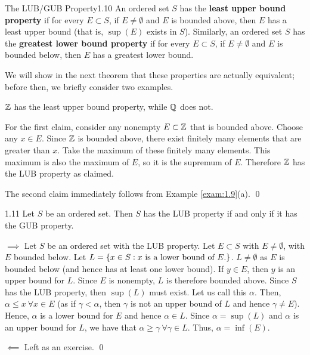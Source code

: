\begin{definition}{The LUB/GUB Property}{1.10}
    An ordered set $S$ has the \textbf{least upper bound property} if for every $E \subset S$, if $E \neq \emptyset$ and $E$ is bounded above, then $E$ has a least upper bound (that is, $\sup(E)$ exists in $S$). Similarly, an ordered set $S$ has the \textbf{greatest lower bound property} if for every $E \subset S$, if $E \neq \emptyset$ and $E$ is bounded below, then $E$ has a greatest lower bound.
\end{definition}
\noindent We will show in the next theorem that these properties are actually equivalent; before then, we briefly consider two examples.
\begin{nexample}{}
    $\mathbb{Z}$ has the least upper bound property, while $\mathbb{Q}$ does not. 
\end{nexample}
\begin{nproof}
    For the first claim, consider any nonempty $E \subset \mathbb{Z}$ that is bounded above. Choose any $x \in E$. Since $\mathbb{Z}$ is bounded above, there exist finitely many elements that are greater than $x$. Take the maximum of these finitely many elements. This maximum is also the maximum of $E$, so it is the supremum of $E$. Therefore $\mathbb{Z}$ has the LUB property as claimed.
    
    The second claim immediately follows from Example \ref{exam:1.9}(a). \qed
\end{nproof}

\begin{theorem}{}{1.11}
    Let $S$ be an ordered set. Then $S$ has the LUB property if and only if it has the GUB property. 
\end{theorem}
\begin{nproof}
    $\boxed{\implies}$ Let $S$ be an ordered set with the LUB property. Let $E \subset S$ with $E \neq \emptyset$, with $E$ bounded below. Let $L = \set{x \in S: x\text{ is a lower bound of $E$.}}$. $L \neq \emptyset$ as $E$ is bounded below (and hence has at least one lower bound). If $y \in E$, then $y$ is an upper bound for $L$. Since $E$ is nonempty, $L$ is therefore bounded above. Since $S$ has the LUB property, then $\sup(L)$ must exist. Let us call this $\alpha$. Then, $\alpha \leq x\ \forall x \in E$ (as if $\gamma < \alpha$, then $\gamma$ is not an upper bound of $L$ and hence $\gamma \neq E$). Hence, $\alpha$ is a lower bound for $E$ and hence $\alpha \in L$. Since $\alpha = \sup(L)$ and $\alpha$ is an upper bound for $L$, we have that $\alpha \geq \gamma\ \forall \gamma \in L$. Thus, $\alpha = \inf(E)$. 

    $\boxed{\impliedby}$ Left as an exercise. \qed
\end{nproof}

